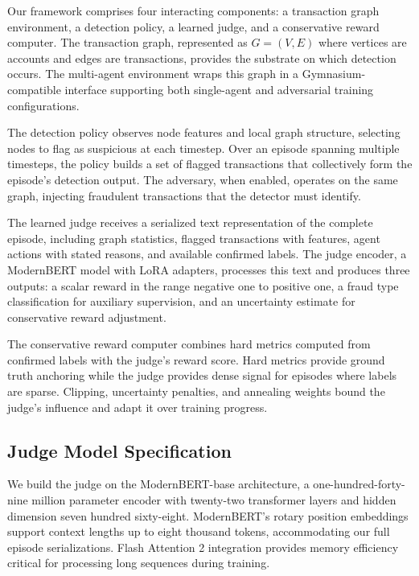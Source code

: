 \documentclass[11pt,a4paper]{article}
\begin{document}
Our framework comprises four interacting components: a transaction graph environment, a detection policy, a learned judge, and a conservative reward computer. The transaction graph, represented as $G = (V, E)$ where vertices are accounts and edges are transactions, provides the substrate on which detection occurs. The multi-agent environment wraps this graph in a Gymnasium-compatible interface supporting both single-agent and adversarial training configurations.

The detection policy observes node features and local graph structure, selecting nodes to flag as suspicious at each timestep. Over an episode spanning multiple timesteps, the policy builds a set of flagged transactions that collectively form the episode's detection output. The adversary, when enabled, operates on the same graph, injecting fraudulent transactions that the detector must identify.

The learned judge receives a serialized text representation of the complete episode, including graph statistics, flagged transactions with features, agent actions with stated reasons, and available confirmed labels. The judge encoder, a ModernBERT model with LoRA adapters, processes this text and produces three outputs: a scalar reward in the range negative one to positive one, a fraud type classification for auxiliary supervision, and an uncertainty estimate for conservative reward adjustment.

The conservative reward computer combines hard metrics computed from confirmed labels with the judge's reward score. Hard metrics provide ground truth anchoring while the judge provides dense signal for episodes where labels are sparse. Clipping, uncertainty penalties, and annealing weights bound the judge's influence and adapt it over training progress.

\subsection{Judge Model Specification}

We build the judge on the ModernBERT-base architecture, a one-hundred-forty-nine million parameter encoder with twenty-two transformer layers and hidden dimension seven hundred sixty-eight. ModernBERT's rotary position embeddings support context lengths up to eight thousand tokens, accommodating our full episode serializations. Flash Attention 2 integration provides memory efficiency critical for processing long sequences during training.
\end{document}
